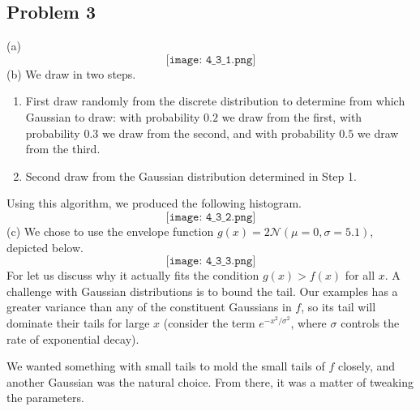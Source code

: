 \documentclass[12pt]{article}
\theoremstyle{remark}
\begin{document}
\subsection*{Problem 3} (a) 
\[
\texttt{[image: 4\_3\_1.png]}
\]
(b) We draw in two steps. 
\begin{enumerate}
\item First draw randomly from the discrete distribution to determine from which Gaussian to draw: with probability $0.2$ we draw from the first, with probability $0.3$ we draw from the second, and with probability $0.5$ we draw from the third. 
\item Second draw from the Gaussian distribution determined in Step 1. 
\end{enumerate}
Using this algorithm, we produced the following histogram. 
\[
\texttt{[image: 4\_3\_2.png]}
\]
(c) We chose to use the envelope function $g(x) = 2\mathcal{N}(\mu = 0, \sigma = 5.1)$, depicted below. 
\[
\texttt{[image: 4\_3\_3.png]}
\]
For let us discuss why it actually fits the condition $g(x)> f(x)$ for all $x$. A challenge with Gaussian distributions is to bound the tail. Our examples has a greater variance than any of the constituent Gaussians in $f$, so its tail will dominate their tails for large $x$ (consider the term $e^{-x^2/\sigma^2}$, where $\sigma$ controls the rate of exponential decay). 

We wanted something with small tails to mold the small tails of $f$ closely, and another Gaussian was the natural choice. From there, it was a matter of tweaking the parameters. 
\end{document}
